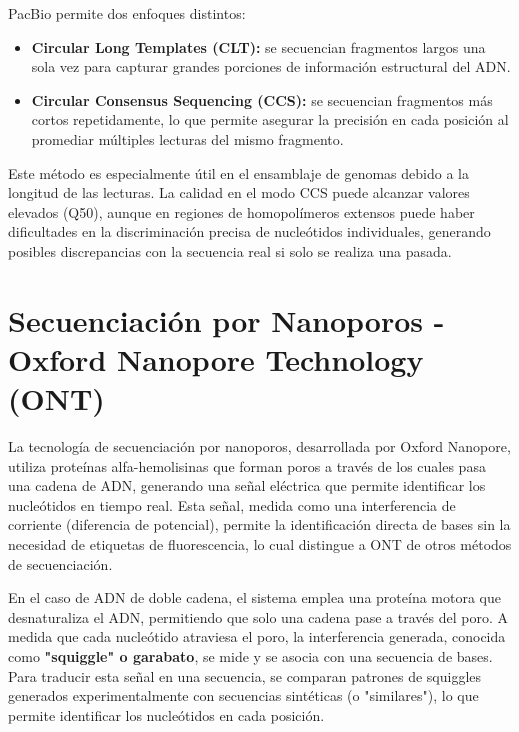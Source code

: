 \begin{itemize}
PacBio permite dos enfoques distintos:
\begin{itemize}
\item \textbf{Circular Long Templates (CLT):} se secuencian fragmentos largos una sola vez para capturar grandes porciones de información estructural del ADN.
\item \textbf{Circular Consensus Sequencing (CCS):} se secuencian fragmentos más cortos repetidamente, lo que permite asegurar la precisión en cada posición al promediar múltiples lecturas del mismo fragmento.
\end{itemize}

Este método es especialmente útil en el ensamblaje de genomas debido a la longitud de las lecturas. La calidad en el modo CCS puede alcanzar valores elevados (Q50), aunque en regiones de homopolímeros extensos puede haber dificultades en la discriminación precisa de nucleótidos individuales, generando posibles discrepancias con la secuencia real si solo se realiza una pasada.

\section{Secuenciación por Nanoporos - Oxford Nanopore Technology (ONT)}
La tecnología de secuenciación por nanoporos, desarrollada por Oxford Nanopore, utiliza proteínas alfa-hemolisinas que forman poros a través de los cuales pasa una cadena de ADN, generando una señal eléctrica que permite identificar los nucleótidos en tiempo real. Esta señal, medida como una interferencia de corriente (diferencia de potencial), permite la identificación directa de bases sin la necesidad de etiquetas de fluorescencia, lo cual distingue a ONT de otros métodos de secuenciación.

En el caso de ADN de doble cadena, el sistema emplea una proteína motora que desnaturaliza el ADN, permitiendo que solo una cadena pase a través del poro. A medida que cada nucleótido atraviesa el poro, la interferencia generada, conocida como \textbf{"squiggle" o garabato}, se mide y se asocia con una secuencia de bases. Para traducir esta señal en una secuencia, se comparan patrones de squiggles generados experimentalmente con secuencias sintéticas (o "similares"), lo que permite identificar los nucleótidos en cada posición.


\end{itemize}
